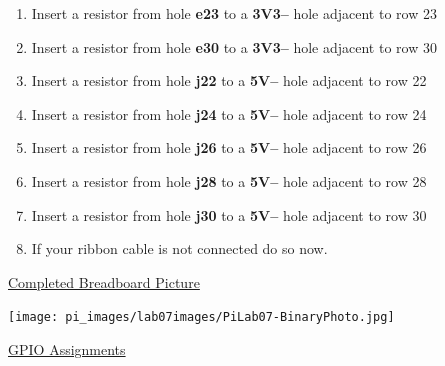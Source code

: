 \begin{enumerate}
	
	\item Insert a resistor from hole \textbf{e23} to a \textbf{3V3--} hole adjacent to row 23
	\item Insert a resistor from hole \textbf{e30} to a \textbf{3V3--} hole adjacent to row 30
	\item Insert a resistor from hole \textbf{j22} to a \textbf{5V--} hole adjacent to row 22
	\item Insert a resistor from hole \textbf{j24} to a \textbf{5V--} hole adjacent to row 24
	\item Insert a resistor from hole \textbf{j26} to a \textbf{5V--} hole adjacent to row 26
	\item Insert a resistor from hole \textbf{j28} to a \textbf{5V--} hole adjacent to row 28
	\item Insert a resistor from hole \textbf{j30} to a \textbf{5V--} hole adjacent to row 30		
	
	\item If your ribbon cable is not connected do so now.
\end{enumerate}


\underline{Completed Breadboard Picture}

\beforefig
\centerline{\texttt{[image: pi\_images/lab07images/PiLab07-BinaryPhoto.jpg]}}
\afterfig

\underline{GPIO Assignments}

